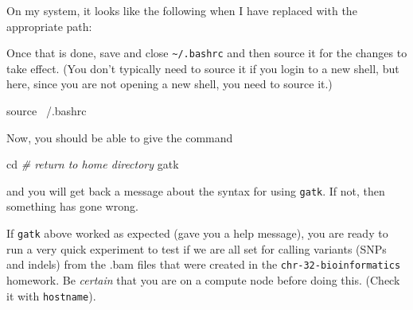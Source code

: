 \documentclass[]{krantz}
\makeatletter
\newenvironment{Shaded}{\begin{snugshade}}{\end{snugshade}}
\newcommand{\BuiltInTok}[1]{#1}
\newcommand{\CommentTok}[1]{\textcolor[rgb]{0.37,0.37,0.37}{\textit{#1}}}
\newcommand{\ExtensionTok}[1]{#1}
\newcommand{\NormalTok}[1]{#1}
\newcommand{\OperatorTok}[1]{\textcolor[rgb]{0.43,0.43,0.43}{\textbf{#1}}}
\newcommand{\VariableTok}[1]{\textcolor[rgb]{0,0,0}{#1}}
\newenvironment{kframe}{%
\medskip{}
\setlength{\fboxsep}{.8em}
 \def\at@end@of@kframe{}%
 \ifinner\ifhmode%
  \def\at@end@of@kframe{\end{minipage}}%
  \begin{minipage}{\columnwidth}%
 \fi\fi%
 \def\FrameCommand##1{\hskip\@totalleftmargin \hskip-\fboxsep
 \colorbox{shadecolor}{##1}\hskip-\fboxsep
     \hskip-\linewidth \hskip-\@totalleftmargin \hskip\columnwidth}%
 \MakeFramed {\advance\hsize-\width
   \@totalleftmargin\z@ \linewidth\hsize
   \@setminipage}}%
 {\par\unskip\endMakeFramed%
 \at@end@of@kframe}
\renewenvironment{Shaded}{\begin{kframe}}{\end{kframe}}
\makeatother
\begin{document}
\begin{Shaded}
\end{Shaded}

On my system, it looks like the following when I have replaced
with the appropriate path:

\begin{Shaded}
\end{Shaded}

Once that is done, save and close \texttt{\textasciitilde{}/.bashrc} and then source it for the changes to take
effect. (You don't typically need to source it if you login to a new shell, but here,
since you are not opening a new shell, you need to source it.)

\begin{Shaded}
\begin{Highlighting}[]
\BuiltInTok{source}\NormalTok{ ~/.bashrc}
\end{Highlighting}
\end{Shaded}

Now, you should be able to give the command

\begin{Shaded}
\begin{Highlighting}[]
\BuiltInTok{cd} \CommentTok{# return to home directory}
\ExtensionTok{gatk}
\end{Highlighting}
\end{Shaded}

and you will get back a message about the syntax for using \texttt{gatk}. If not,
then something has gone wrong.

If \texttt{gatk} above worked as expected (gave you a help message), you are ready
to run a very quick experiment to test if we are all set
for calling variants (SNPs and indels) from the .bam files that were
created in the \texttt{chr-32-bioinformatics} homework. Be \emph{certain} that you
are on a compute node before doing this. (Check it with \texttt{hostname}).
\end{document}
